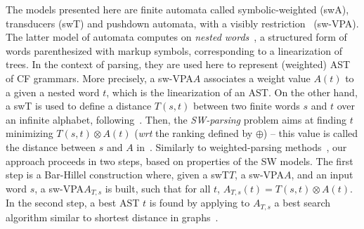 \documentclass[runningheads]{llncs}
\def\wrt{\textit{wrt}\xspace}
\newcommand{\Semiring}{\mathbb{S}}
\def\SWT{\textsf{swT}\xspace}
\def\SWA{\textsf{swA}\xspace}
\def\SWVPA{\textsf{sw-VPA}\xspace}
\begin{document}
%
%
The models presented here are finite automata called symbolic-weighted (\SWA),
transducers (\SWT) and pushdown automata,
with a visibly restriction~\cite{AlurMadhusudan09nested} (\SWVPA).
The latter model of automata computes on \emph{nested words}~\cite{AlurMadhusudan09nested}, 
a structured form of words parenthesized with markup symbols, 
corresponding to a linearization of trees.
In the context of parsing, they are used here to represent (weighted) AST of CF grammars.
More precisely, a \SWVPA $A$ associates a weight value $A(t)$ %
to a given a nested word $t$, which is the linearization of an AST. %
%
On the other hand, 
a \SWT is used to define a distance $T(s, t)$ between two finite words $s$ and $t$
over an infinite alphabet, following~\cite{Mohri03EDWA}.
Then, the \emph{SW-parsing} problem aims at %
finding $t$ minimizing 
$T(s, t) \otimes A(t)$ (\wrt the ranking defined by $\oplus$)
-- this value is called the distance between $s$ and $A$ in~\cite{Mohri03EDWA}.
%
Similarly to weighted-parsing 
methods~\cite{Goodman99SemiringParsing,Nederhof03weightedParsing,MorbitzVogler19weighted-parsing}, 
our approach proceeds in two steps, 
based on properties of the SW models. 
The first step is a Bar-Hillel construction where, 
given a \SWT $T$, a \SWVPA $A$, and an input word $s$, 
a \SWVPA $A_{T, s}$ is built, such that for all $t$, $A_{T, s}(t) = T(s, t) \otimes A(t)$.
In the second step, a best AST $t$ is found by applying to $A_{T, s}$ 
a best search algorithm similar to shortest distance in graphs~\cite{Mohri02semiring,Huang05kbest}.
%
\end{document}
